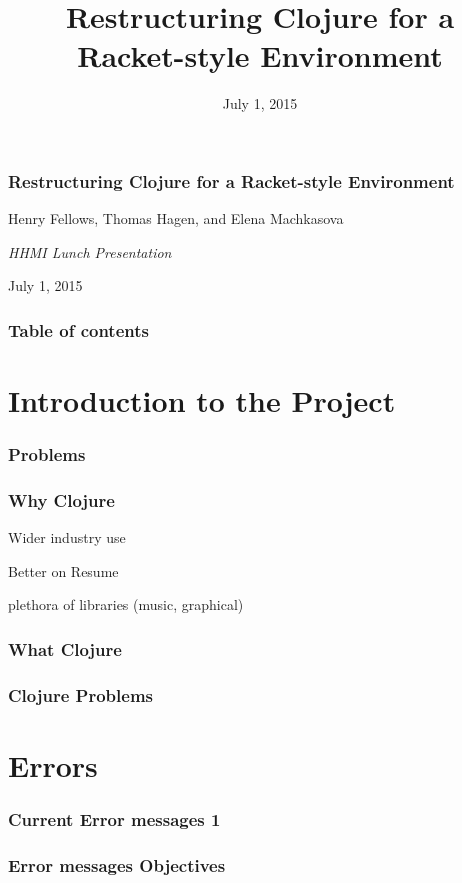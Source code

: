 \documentclass{beamer}
\begin{document}
\title{Restructuring Clojure for a Racket-style Environment}
\date{July 1, 2015}

\begin{frame}
\frametitle {Restructuring Clojure for a Racket-style Environment}
{\centering
\noindent
Henry Fellows, Thomas Hagen, and Elena Machkasova \par

{\it 
HHMI Lunch Presentation\par
July 1, 2015\par}
}
\end{frame}

\begin{frame}
\frametitle{Table of contents}
\tableofcontents  
\end{frame}

\section{Introduction to the Project}

\begin{frame}
	\frametitle{Problems}
\end{frame}

\begin{frame}
	\frametitle{Why Clojure}
	\item Wider industry use
	\item Better on Resume
	\item plethora of libraries (music, graphical)
\end{frame}

\begin{frame}
	\frametitle{What Clojure}
\end{frame}

\begin{frame}
	\frametitle{Clojure Problems}
\end{frame}



\section{Errors}

\begin{frame}
	\frametitle{Current Error messages 1}
\end{frame}

\begin{frame}
	\frametitle{Error messages Objectives}
\end{frame}
\end{document}
